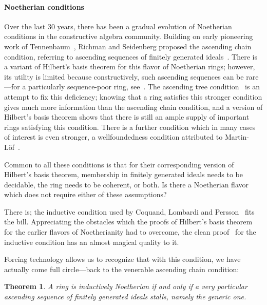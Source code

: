 \documentclass[com,11pt,crcready]{iosart2x}
\theoremstyle{definition}
\theoremstyle{plain}
\newtheorem{theorem}[definition]{Theorem}
\theoremstyle{remark}
\newcommand{\?}{\,{:}\,}
\renewcommand{\_}{\mathpunct{.}\,}
\begin{document}
\paragraph{Noetherian conditions} Over the last 30 years, there has been a
gradual evolution of Noetherian conditions in the constructive algebra
community. Building on early pioneering work of
Tennenbaum~\cite{tennenbaum:hilbert}, Richman and Seidenberg proposed the
ascending chain condition, referring to ascending sequences of finitely
generated ideals~\cite{richman:noetherian-old,seidenberg:noether}. There is a
variant of Hilbert's basis theorem for this flavor of Noetherian rings;
however, its utility is limited because constructively, such ascending
sequences can be rare---for a particularly sequence-poor ring,
see~\cite[Example~2]{blass:induction}.
%
The ascending tree condition~\cite{richman:noetherian} is an attempt to fix
this deficiency; knowing that a ring satisfies this stronger condition gives much more
information than the ascending chain condition, and a version of Hilbert's
basis theorem shows that there is still an ample supply of important rings
satisfying this condition. There is a further condition which in many cases
of interest is even stronger, a wellfoundedness condition attributed to
Martin-Löf~\cite{jacobsson-lofwall:standard}.

Common to all these conditions is that for their corresponding version of
Hilbert's basis theorem, membership in finitely generated ideals needs to be
decidable, the ring needs to be coherent, or both. Is there a Noetherian flavor
which does not require either of these assumptions?

There is; the inductive condition used by Coquand, Lombardi and
Persson~\cite{coquand-persson:groebner,coquand-lombardi:krull} fits the bill.
Appreciating the obstacles which the proofs of Hilbert's basis theorem for the
earlier flavors of Noetherianity had to overcome, the clean proof~\cite[Corollary~16]{coquand-persson:groebner} for the
inductive condition has an almost magical
quality to it.

Forcing technology allows us to recognize that with this condition, we have
actually come full circle---back to the venerable ascending chain condition:

\begin{theorem}A ring is inductively Noetherian if and only if a very
particular ascending sequence of finitely generated ideals stalls, namely
\emph{the generic one}.
\end{theorem}
\end{document}
